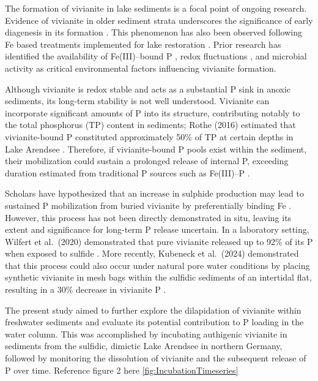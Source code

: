 \documentclass[12pt,twoside]{book}
\begin{document}
The formation of vivianite in lake sediments is a focal point of ongoing research. Evidence of vivianite in older sediment strata underscores the significance of early diagenesis in its formation \citep{Dijkstra2018, Scholtysik2022}. This phenomenon has also been observed following Fe based treatments implemented for lake restoration \citep{Heinrich2021}. Prior research has identified the availability of Fe(III)--bound P \citep{Heinrich2020, Kubeneck2024}, redox fluctuations \citep{Parsons2017}, and microbial activity \citep{Cosmidis2014, Sanchez2015} as critical environmental factors influencing vivianite formation.

Although vivianite is redox stable and acts as a substantial P sink in anoxic sediments, its long-term stability is not well understood. Vivianite can incorporate significant amounts of P into its structure, contributing notably to the total phosphorus (TP) content in sediments; Rothe (2016) estimated that vivianite-bound P constituted approximately 50\% of TP at certain depths in Lake Arendsee \citep{Rothe2016}. Therefore, if vivianite-bound P pools exist within the sediment, their mobilization could sustain a prolonged release of internal P, exceeding duration estimated from traditional P sources such as Fe(III)--P \citep{Katsev2006}.

Scholars have hypothesized that an increase in sulphide production may lead to sustained P mobilization from buried vivianite by preferentially binding Fe \citep{Roden1997, Gachter2003, Katsev2006}. However, this process has not been directly demonstrated in situ, leaving its extent and significance for long-term P release uncertain. In a laboratory setting, Wilfert et al.~(2020) demonstrated that pure vivianite released up to 92\% of its P when exposed to sulfide \citep{Wilfert2020}. More recently, Kubeneck et al.~(2024) demonstrated that this process could also occur under natural pore water conditions by placing synthetic vivianite in mesh bags within the sulfidic sediments of an intertidal flat, resulting in a 30\% decrease in vivianite P \citep{Kubeneck2024}.

The present study aimed to further explore the dilapidation of vivianite within freshwater sediments and evaluate its potential contribution to P loading in the water column. This was accomplished by incubating authigenic vivianite in sediments from the sulfidic, dimictic Lake Arendsee in northern Germany, followed by monitoring the dissolution of vivianite and the subsequent release of P over time.
Reference figure 2 here \ref{fig:IncubationTimeseries}
\end{document}
